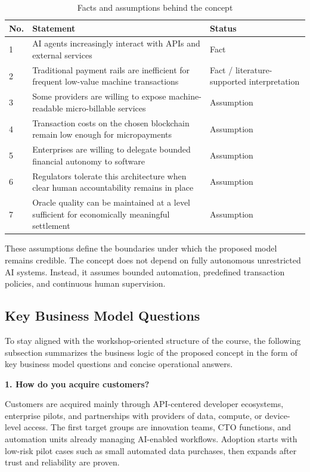 \documentclass[12pt,a4paper,oneside]{article}
\theoremstyle{definition}
\theoremstyle{plain}
\begin{document}
\begin{table}[H]
\centering
\caption{Facts and assumptions behind the concept}
\label{tab:assumptions}
\begin{tabular}{p{0.9cm}p{8.5cm}p{4.8cm}}
\toprule
\textbf{No.} & \textbf{Statement} & \textbf{Status} \\
\midrule
1 & AI agents increasingly interact with APIs and external services & Fact \\
2 & Traditional payment rails are inefficient for frequent low-value machine transactions & Fact / literature-supported interpretation \\
3 & Some providers are willing to expose machine-readable micro-billable services & Assumption \\
4 & Transaction costs on the chosen blockchain remain low enough for micropayments & Assumption \\
5 & Enterprises are willing to delegate bounded financial autonomy to software & Assumption \\
6 & Regulators tolerate this architecture when clear human accountability remains in place & Assumption \\
7 & Oracle quality can be maintained at a level sufficient for economically meaningful settlement & Assumption \\
\bottomrule
\end{tabular}
\end{table}

These assumptions define the boundaries under which the proposed model remains credible. The concept does not depend on fully autonomous unrestricted AI systems. Instead, it assumes bounded automation, predefined transaction policies, and continuous human supervision.

\subsection{Key Business Model Questions}
To stay aligned with the workshop-oriented structure of the course, the following subsection summarizes the business logic of the proposed concept in the form of key business model questions and concise operational answers.

\vspace{0.5em}

\textbf{1. How do you acquire customers?}

Customers are acquired mainly through API-centered developer ecosystems, enterprise pilots, and partnerships with providers of data, compute, or device-level access. The first target groups are innovation teams, CTO functions, and automation units already managing AI-enabled workflows. Adoption starts with low-risk pilot cases such as small automated data purchases, then expands after trust and reliability are proven.
\end{document}
